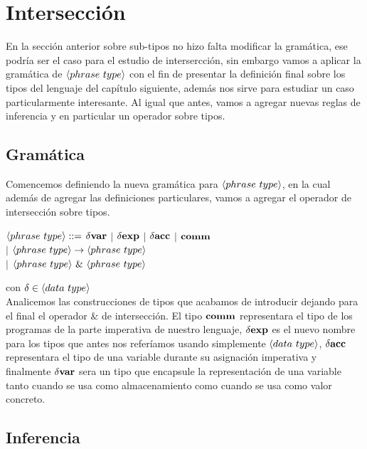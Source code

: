 \section{Intersecci\'on}

En la secci\'on anterior sobre sub-tipos no hizo falta modificar la gram\'atica, ese
podr\'ia ser el caso para el estudio de intersercci\'on, sin embargo vamos a aplicar 
la gram\'atica de $\langle phrase \ type \rangle$ con el fin de presentar la definici\'on
final sobre los tipos del lenguaje del cap\'itulo siguiente, adem\'as nos sirve para
estudiar un caso particularmente interesante. Al igual que antes, vamos a agregar 
nuevas reglas de inferencia y en particular un operador sobre tipos.

\subsection{Gram\'atica}

Comencemos definiendo la nueva gram\'atica para $\langle phrase \ type \rangle$, en la cual
adem\'as de agregar las definiciones particulares, vamos a agregar el operador de 
intersecci\'on sobre tipos.

\begin{center} 
$\langle phrase \ type \rangle::=$ $\delta \textbf{var}$ $|$ $\delta \textbf{exp}$ $|$ $\delta \textbf{acc}$ $|$ $\textbf{comm}$\\
$|$ $\langle phrase \ type \rangle \rightarrow \langle phrase \ type \rangle$ \\
$|$ $\lrangles{phrase \ type} \ \& \ \lrangles{phrase \ type}$
\end{center}
con $\delta \in \lrangles{data \ type}$\\

Analicemos las construcciones de tipos que acabamos de introducir dejando para el final
el operador $\&$ de intersecci\'on. El tipo $\textbf{comm}$ representara el tipo de los programas
de la parte imperativa de nuestro lenguaje, $\delta \textbf{exp}$ es el nuevo nombre para los tipos
que antes nos refer\'iamos usando simplemente $\langle data \ type \rangle$, $\delta \textbf{acc}$ 
representara el tipo de una variable durante su asignaci\'on imperativa y finalmente
$\delta \textbf{var}$ sera un tipo que encapsule la representaci\'on de una variable tanto
cuando se usa como almacenamiento como cuando se usa como valor concreto.

\subsection{Inferencia}

